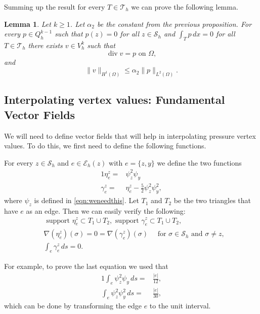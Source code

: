 \documentclass[11pt]{amsart}
\numberwithin{equation}{section}
\newcommand{\Eh}{\mathcal{E}_h}
\newcommand{\Sh}{\mathcal{S}_h}
\newcommand{\dive}{\operatorname{div}}
\newcommand{\Th}{\mathcal{T}_h}
\newtheorem{lemma}{Lemma}
\theoremstyle{definition}
\begin{document}
Summing up the result for every $T \in \mathcal{T}_h$ we can prove the following lemma.
\begin{lemma}\label{lemma3}
Let $k \ge 1$. Let $\alpha_2$ be the constant from the previous proposition. For every $p \in Q_h^{k-1}$ such that $p(z) =0$ for all $z \in \Sh$ and $\int_T p \, dx =0$ for all $T \in \Th$ there exists $v \in V_h^k$ such that 
\begin{equation*}
\dive v = p\text{ on }  \Omega,
\end{equation*}
and
\begin{equation*}
\|v\|_{H^1(\Omega)} \le \alpha_2 \|p\|_{L^2(\Omega)}.
\end{equation*}
\end{lemma}



\subsection{ Interpolating vertex values: Fundamental Vector Fields}
We will need to define vector fields that will help in interpolating pressure 
vertex values. To do this, we first need to define the following functions.

For every $z \in \Sh$  and $e \in \Eh(z)$ with $e=\{ z, y\}$ we define the two functions
\begin{alignat*}{1}
\eta_e^z= & \psi_z^2 \psi_y  \\
\gamma_e^z=&\eta_e^z- \frac{5}{2} \psi_z^2 \psi_y^2,
\end{alignat*}
where $\psi_z$ is defined in \eqref{eqn:weneedthis}.
Let $T_1$ and $T_2$ be the two triangles that have $e$ as an edge.
Then we can easily verify the following:
\begin{subequations}\label{eta}
\begin{alignat}{1}
& \text{ support } \eta_e^z  \subset T_1 \cup T_2 ,  \text{ support }  \gamma_e^z \subset T_1 \cup T_2,  \label{eta1} \\
& \nabla(\eta_e^z) (\sigma )=0= \nabla(\gamma_e^z) (\sigma ) \quad \text{ for  } \sigma \in \Sh  \text{ and }   \sigma \neq z, \label{eta2} \\
 &\int_e \gamma_e^z \, ds =0 \label{eta3}.
\end{alignat}
\end{subequations}

For example, to prove the last equation we used that
\begin{alignat}{1}
\int_e \psi_z^2 \psi_y \, ds=& \frac{|e|}{12} , \label{psi1} \\
\int_e \psi_z^2 \psi_y^2 \, ds=& \frac{|e|}{30}, \label{psi2}
\end{alignat}
which can be done by transforming the edge $e$ to the unit interval. 
 
\end{document}
